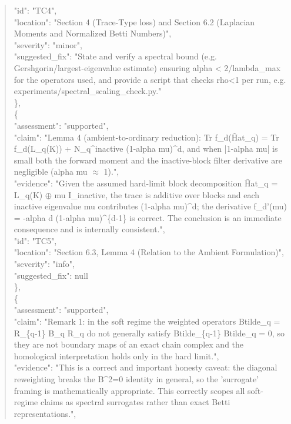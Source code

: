 \documentclass[11pt]{article}
\begin{document}
\begin{quote}
      "id": "TC4",\\
      "location": "Section 4 (Trace-Type loss) and Section 6.2 (Laplacian Moments and Normalized Betti Numbers)",\\
      "severity": "minor",\\
      "suggested\_fix": "State and verify a spectral bound (e.g. Gershgorin/largest-eigenvalue estimate) ensuring alpha < 2/lambda\_max for the operators used, and provide a script that checks rho<1 per run, e.g. experiments/spectral\_scaling\_check.py."\\
    \},\\
    \{\\
      "assessment": "supported",\\
      "claim": "Lemma 4 (ambient-to-ordinary reduction): Tr f\_d(Ĥat\_q) = Tr f\_d(L\_q(K)) + N\_q\^{}inactive (1-alpha mu)\^{}d, and when |1-alpha mu| is small both the forward moment and the inactive-block filter derivative are negligible (alpha mu \ensuremath{\approx} 1).",\\
      "evidence": "Given the assumed hard-limit block decomposition Ĥat\_q = L\_q(K) \ensuremath{\oplus} mu I\_inactive, the trace is additive over blocks and each inactive eigenvalue mu contributes (1-alpha mu)\^{}d; the derivative f\_d'(mu) = -alpha d (1-alpha mu)\^{}\{d-1\} is correct. The conclusion is an immediate consequence and is internally consistent.",\\
      "id": "TC5",\\
      "location": "Section 6.3, Lemma 4 (Relation to the Ambient Formulation)",\\
      "severity": "info",\\
      "suggested\_fix": null\\
    \},\\
    \{\\
      "assessment": "supported",\\
      "claim": "Remark 1: in the soft regime the weighted operators Btilde\_q = R\_\{q-1\} B\_q R\_q do not generally satisfy Btilde\_\{q-1\} Btilde\_q = 0, so they are not boundary maps of an exact chain complex and the homological interpretation holds only in the hard limit.",\\
      "evidence": "This is a correct and important honesty caveat: the diagonal reweighting breaks the B\^{}2=0 identity in general, so the 'surrogate' framing is mathematically appropriate. This correctly scopes all soft-regime claims as spectral surrogates rather than exact Betti representations.",\\

\end{quote}
\end{document}
